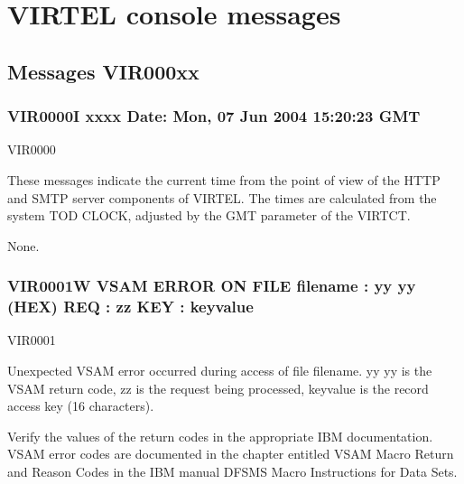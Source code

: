 \documentclass[letterpaper,10pt,english]{sphinxmanual}
\begin{document}
\section{VIRTEL console messages}
\label{\detokenize{messages:virtel-console-messages}}

\subsection{Messages VIR000xx}
\label{\detokenize{messages:messages-vir000xx}}

\subsubsection{VIR0000I xxxx Date: Mon, 07 Jun 2004 15:20:23 GMT}
\label{\detokenize{messages:vir0000i-xxxx-date-mon-07-jun-2004-15-20-23-gmt}}\begin{description}
\sphinxAtStartPar
VIR0000

\sphinxAtStartPar
These messages indicate the current time from the point of view of the HTTP and SMTP server components of VIRTEL. The times are calculated from the system TOD CLOCK, adjusted by the GMT parameter of the VIRTCT.

\sphinxAtStartPar
None.

\end{description}


\subsubsection{VIR0001W VSAM ERROR ON FILE filename : yy yy (HEX) REQ : zz KEY : keyvalue}
\label{\detokenize{messages:vir0001w-vsam-error-on-file-filename-yy-yy-hex-req-zz-key-keyvalue}}\begin{description}
\sphinxAtStartPar
VIR0001

\sphinxAtStartPar
Unexpected VSAM error occurred during access of file filename. yy yy is the VSAM return code, zz is the request being processed, keyvalue is the record access key (16 characters).

\sphinxAtStartPar
Verify the values of the return codes in the appropriate IBM documentation. VSAM error codes are documented in the chapter entitled VSAM Macro Return and Reason Codes in the IBM manual DFSMS Macro Instructions for Data Sets.

\end{description}
\end{document}
